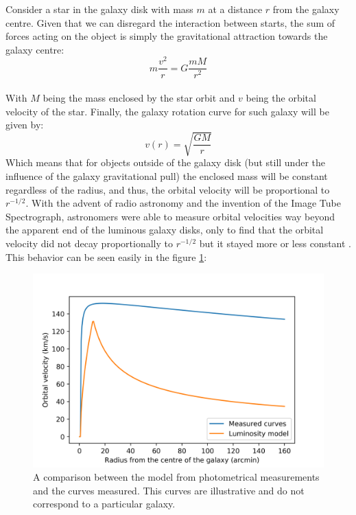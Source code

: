 Consider a star in the galaxy disk with mass $m$ at a distance $r$ from the galaxy centre.
Given that we can disregard the interaction between starts, the sum of forces acting on the object is simply the gravitational attraction towards the galaxy centre:
\begin{equation}
\label{heh}
m\frac{v^2}{r} = G \frac{mM}{r^2}
\end{equation}\\
\vspace{-1mm}With $M$ being the mass enclosed by the star orbit and $v$ being the orbital velocity of the star. Finally, the galaxy rotation curve for such galaxy will be given by:
\begin{equation}
v(r) = \sqrt{\frac{GM}{r}}
\end{equation}%
Which means that for objects outside of the galaxy disk (but still under the influence of the galaxy gravitational pull) the enclosed mass will be constant regardless of the radius, and thus, the orbital velocity will be proportional to $r^{-1/2}$. With the advent of radio astronomy and the invention of the Image Tube Spectrograph, astronomers were able to measure orbital velocities way beyond the apparent end of the luminous galaxy disks, only to find that the orbital velocity did not decay proportionally to $r^{-1/2}$ but it stayed more or less constant\cite{h21Line} \cite{galactoDistance} \cite{veraFirst}. This behavior can be seen easily in the figure \ref{galaxyCurve}:%
\begin{figure}[ht]
    \centering
    \includegraphics[scale=0.8]{imag/galaxyRotCurv.png}
    \caption{A comparison between the model from photometrical measurements and the curves measured. This curves are illustrative and do not correspond to a particular galaxy.}
    \label{galaxyCurve}
\end{figure}

